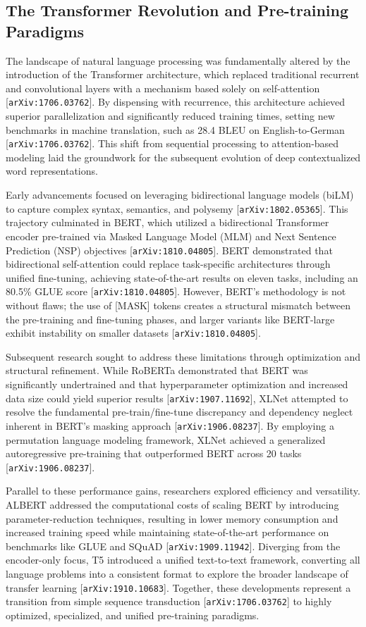 \documentclass[11pt]{article}
\begin{document}
\subsection{The Transformer Revolution and Pre-training Paradigms}

The landscape of natural language processing was fundamentally altered by the introduction of the Transformer architecture, which replaced traditional recurrent and convolutional layers with a mechanism based solely on self-attention [\texttt{arXiv:1706.03762}]. By dispensing with recurrence, this architecture achieved superior parallelization and significantly reduced training times, setting new benchmarks in machine translation, such as 28.4 BLEU on English-to-German [\texttt{arXiv:1706.03762}]. This shift from sequential processing to attention-based modeling laid the groundwork for the subsequent evolution of deep contextualized word representations.

Early advancements focused on leveraging bidirectional language models (biLM) to capture complex syntax, semantics, and polysemy [\texttt{arXiv:1802.05365}]. This trajectory culminated in BERT, which utilized a bidirectional Transformer encoder pre-trained via Masked Language Model (MLM) and Next Sentence Prediction (NSP) objectives [\texttt{arXiv:1810.04805}]. BERT demonstrated that bidirectional self-attention could replace task-specific architectures through unified fine-tuning, achieving state-of-the-art results on eleven tasks, including an 80.5\% GLUE score [\texttt{arXiv:1810.04805}]. However, BERT's methodology is not without flaws; the use of [MASK] tokens creates a structural mismatch between the pre-training and fine-tuning phases, and larger variants like BERT-large exhibit instability on smaller datasets [\texttt{arXiv:1810.04805}].

Subsequent research sought to address these limitations through optimization and structural refinement. While RoBERTa demonstrated that BERT was significantly undertrained and that hyperparameter optimization and increased data size could yield superior results [\texttt{arXiv:1907.11692}], XLNet attempted to resolve the fundamental pre-train/fine-tune discrepancy and dependency neglect inherent in BERT's masking approach [\texttt{arXiv:1906.08237}]. By employing a permutation language modeling framework, XLNet achieved a generalized autoregressive pre-training that outperformed BERT across 20 tasks [\texttt{arXiv:1906.08237}].

Parallel to these performance gains, researchers explored efficiency and versatility. ALBERT addressed the computational costs of scaling BERT by introducing parameter-reduction techniques, resulting in lower memory consumption and increased training speed while maintaining state-of-the-art performance on benchmarks like GLUE and SQuAD [\texttt{arXiv:1909.11942}]. Diverging from the encoder-only focus, T5 introduced a unified text-to-text framework, converting all language problems into a consistent format to explore the broader landscape of transfer learning [\texttt{arXiv:1910.10683}]. Together, these developments represent a transition from simple sequence transduction [\texttt{arXiv:1706.03762}] to highly optimized, specialized, and unified pre-training paradigms.
\end{document}
